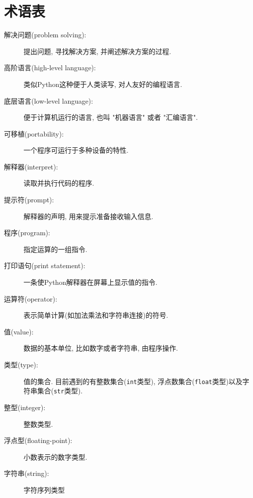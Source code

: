 \documentclass[10pt]{book}
\begin{document}
\section{术语表}

\begin{description}

\item[解决问题(problem solving):] 提出问题, 寻找解决方案, 并阐述解决方案的过程. 

\item[高阶语言(high-level language):] 类似Python这种便于人类读写, 对人友好的编程语言. 

\item[底层语言(low-level language):] 便于计算机运行的语言, 也叫 "机器语言" 或者 "汇编语言".

\item[可移植(portability):] 一个程序可运行于多种设备的特性. 

\item[解释器(interpret):] 读取并执行代码的程序. 

\item[提示符(prompt):] 解释器的声明, 用来提示准备接收输入信息. 

\item[程序(program):] 指定运算的一组指令. 

\item[打印语句(print statement):] 一条使Python解释器在屏幕上显示值的指令. 

\item[运算符(operator):] 表示简单计算(如加法乘法和字符串连接)的符号. 

\item[值(value):] 数据的基本单位, 比如数字或者字符串, 由程序操作. 

\item[类型(type):] 值的集合. 目前遇到的有整数集合({\tt int}类型), 
浮点数集合({\tt float}类型)以及字符串集合({\tt str}类型).

\item[整型(integer):] 整数类型. 

\item[浮点型(floating-point):] 小数表示的数字类型. 

\item[字符串(string):] 字符序列类型


\end{description}
\end{document}
